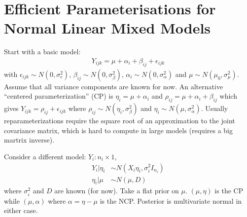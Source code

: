 \documentclass{article}\usepackage[]{graphicx}\usepackage[]{color}
\begin{document}
\section{Efficient Parameterisations for Normal Linear Mixed Models \citet{gelfand1995efficient}}
Start with a basic model:
\begin{align*}
  Y_{ijk} = \mu + \alpha_i + \beta_{ij} + \epsilon_{ijk}
\end{align*}
with $\epsilon_{ijk}\sim N(0,\sigma^2_e)$, $\beta_{ij}\sim N(0,\sigma^2_\beta)$, $\alpha_i\sim N(0,\sigma^2_\alpha)$ and $\mu\sim N(\mu_0, \sigma^2_\mu)$. Assume that all variance components are known for now. An alternative ``centered parameterization'' (CP) is $\eta_i=\mu +\alpha_i$ and $\rho_{ij}=\mu + \alpha_i + \beta_{ij}$ which gives $Y_{ijk}=\rho_{ij} + \epsilon_{ijk}$ where $\rho_{ij}\sim N(\eta_i, \sigma_\beta^2)$ and $\eta_i\sim N(\mu,\sigma^2_\alpha)$. Usually reparameterizations require the square root of an approximation to the joint covariance matrix, which is hard to compute in large models (requires a big martrix inverse).

Consider a different model: $Y_i:n_i\times 1$, 
\begin{align*}
  Y_i|\eta_i &\sim N(X_i\eta_i, \sigma_i^2I_{n_i})\\
  \eta_i|\mu &\sim N(\mu, D)
\end{align*}
where $\sigma_i^2$ and $D$ are known (for now). Take a flat prior on $\mu$. $(\mu,\eta)$ is the CP while $(\mu,\alpha)$ where $\alpha=\eta - \mu$ is the NCP. Posterior is multivariate normal in either case.
\end{document}

